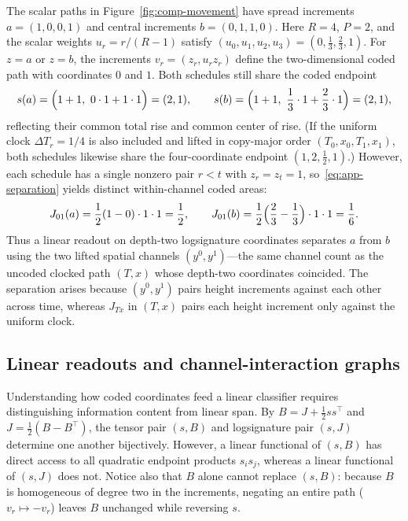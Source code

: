 \begin{example}
\label{ex:two-rises}
The scalar paths in Figure~\ref{fig:comp-movement} have spread increments
\(a = (1, 0, 0, 1)\) and central increments \(b = (0, 1, 1, 0)\).
Here \(R=4\), \(P=2\), and the scalar weights \(u_r=r/(R-1)\) satisfy
\((u_0,u_1,u_2,u_3)=(0,\tfrac13,\tfrac23,1)\).
For \(z=a\) or \(z=b\), the increments \(v_r=(z_r,u_r z_r)\) define the
two-dimensional coded path with coordinates \(0\) and \(1\). Both
schedules still share the coded endpoint
\[
 s(a) = \Bigl(1 + 1,\ 0\cdot 1 + 1\cdot 1\Bigr) = (2, 1), \qquad
 s(b) = \Bigl(1 + 1,\ \frac{1}{3}\cdot 1 + \frac{2}{3}\cdot 1\Bigr) = (2, 1),
\]
reflecting their common total rise and common center of rise. (If the uniform
clock \(\Delta T_r = 1/4\) is also included and lifted in copy-major order
\((T_0, x_0, T_1, x_1)\), both schedules likewise share the four-coordinate
endpoint \((1, 2, \tfrac12, 1)\).) However, each schedule has a single nonzero
pair \(r < t\) with \(z_r = z_t = 1\), so~\eqref{eq:app-separation} yields
distinct within-channel coded areas:
\[
 J_{01}(a) = \frac{1}{2}(1 - 0)\cdot 1\cdot 1 = \frac{1}{2}, \qquad
 J_{01}(b) = \frac{1}{2}\Bigl(\frac{2}{3} - \frac{1}{3}\Bigr)\cdot 1\cdot 1
           = \frac{1}{6}.
\]
Thus a linear readout on depth-two logsignature coordinates separates \(a\) from
\(b\) using the two lifted spatial channels \((y^0, y^1)\)---the same channel
count as the uncoded clocked path \((T, x)\) whose depth-two coordinates
coincided. The separation arises because \((y^0, y^1)\) pairs height increments
against each other across time, whereas \(J_{Tx}\) in \((T, x)\) pairs each
height increment only against the uniform clock.
\end{example}

\subsection{Linear readouts and channel-interaction graphs}
Understanding how coded coordinates feed a linear classifier requires
distinguishing information content from linear span. By \(B = J + \tfrac12 s s^\top\)
and \(J = \tfrac12(B - B^\top)\), the tensor pair \((s, B)\) and logsignature pair
\((s, J)\) determine one another bijectively. However, a linear functional of
\((s, B)\) has direct access to all quadratic endpoint products \(s_i s_j\),
whereas a linear functional of \((s, J)\) does not. Notice also that \(B\) alone
cannot replace \((s, B)\): because \(B\) is homogeneous of degree two in the
increments, negating an entire path (\(v_r \mapsto -v_r\)) leaves \(B\)
unchanged while reversing \(s\).

